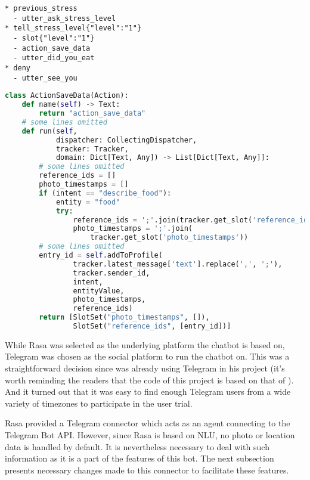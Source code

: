\begin{lstlisting}[label={story_slot},caption={Using slots in stories to save user's stress level},captionpos=b]
* previous_stress
  - utter_ask_stress_level
* tell_stress_level{"level":"1"}
  - slot{"level":"1"}
  - action_save_data
  - utter_did_you_eat
* deny
  - utter_see_you
\end{lstlisting}

\bigskip
\begin{lstlisting}[label={action_slot},caption={Getting and setting slots in a custom action to relate entries in persistent data. "photo\_timestamps" and "reference\_ids" are used to find the correct photos to be send to the user in the future\, which help the user to reflect food.},language=Python,captionpos=b]
class ActionSaveData(Action):
    def name(self) -> Text:
        return "action_save_data"
    # some lines omitted
    def run(self,
            dispatcher: CollectingDispatcher,
            tracker: Tracker,
            domain: Dict[Text, Any]) -> List[Dict[Text, Any]]:
        # some lines omitted
        reference_ids = []
        photo_timestamps = []
        if (intent == "describe_food"):
            entity = "food"
            try:
                reference_ids = ';'.join(tracker.get_slot('reference_ids'))
                photo_timestamps = ';'.join(
                    tracker.get_slot('photo_timestamps'))
        # some lines omitted
        entry_id = self.addToProfile(
                tracker.latest_message['text'].replace(',', ';'),
                tracker.sender_id,
                intent,
                entityValue,
                photo_timestamps,
                reference_ids)
        return [SlotSet("photo_timestamps", []),
                SlotSet("reference_ids", [entry_id])]
\end{lstlisting}

\bigskip
While Rasa was selected as the underlying platform the chatbot is based on, Telegram was chosen as the social platform to run the chatbot on. This was a straightforward decision since \citeauthor{17_ludwig} was already using Telegram in his project (it's worth reminding the readers that the code of this project is based on that of \citeauthor{17_ludwig}). And it turned out that it was easy to find enough Telegram users from a wide variety of timezones to participate in the user trial.

Rasa provided a Telegram connector which acts as an agent connecting to the Telegram Bot API. However, since Rasa is based on NLU, no photo or location data is handled by default. It is nevertheless necessary to deal with such information as it is a part of the features of this bot. The next subsection presents necessary changes made to this connector to facilitate these features.


